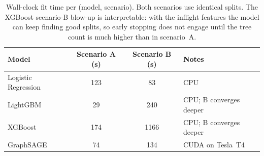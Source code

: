 \begin{table}[H]
    \centering
    \caption{Wall-clock fit time per (model, scenario). Both scenarios use identical splits. The XGBoost scenario-B blow-up is interpretable: with the inflight features the model can keep finding good splits, so early stopping does not engage until the tree count is much higher than in scenario~A.}
    \label{tab:train-times}
    \small
    \begin{tabular}{l S[table-format=4.0] S[table-format=4.0] l}
        \toprule
        Model & {Scenario A (s)} & {Scenario B (s)} & Notes \\
        \midrule
        Logistic Regression & 123 &   83 & CPU \\
        LightGBM            &  29 &  240 & CPU; B converges deeper \\
        XGBoost             & 174 & 1166 & CPU; B converges deeper \\
        GraphSAGE           &  74 &  134 & CUDA on Tesla~T4 \\
        \bottomrule
    \end{tabular}
\end{table}
